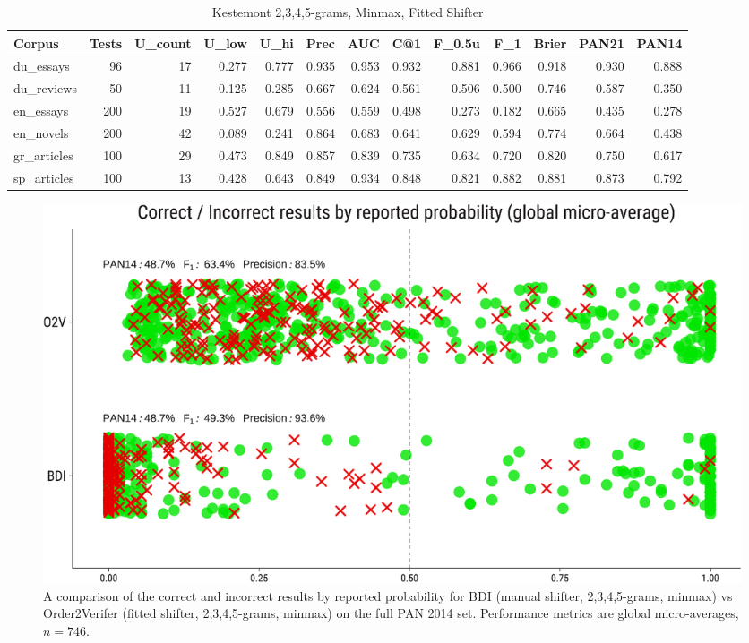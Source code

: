 \documentclass[
    hf
]{ceurart}
\begin{document}
\begin{table}
    \caption{Kestemont 2,3,4,5-grams, Minmax, Fitted Shifter}
    \label{tab:o2v}
    \raggedright
    \begin{adjustbox}{max width=\textwidth}

        \begin{tabular}{lrrrrrrrrrrrr}
            \toprule
            Corpus       & Tests & U_{count} & U_{low} & U_{hi} & Prec  & AUC   & C@1   & F_{0.5u} & F_1   & Brier & PAN21 & PAN14 \\
            \midrule
            du\_essays   & 96    & 17        & 0.277   & 0.777  & 0.935 & 0.953 & 0.932 & 0.881   & 0.966 & 0.918 & 0.930 & 0.888 \\
            du\_reviews  & 50    & 11        & 0.125   & 0.285  & 0.667 & 0.624 & 0.561 & 0.506   & 0.500 & 0.746 & 0.587 & 0.350 \\
            en\_essays   & 200   & 19        & 0.527   & 0.679  & 0.556 & 0.559 & 0.498 & 0.273   & 0.182 & 0.665 & 0.435 & 0.278 \\
            en\_novels   & 200   & 42        & 0.089   & 0.241  & 0.864 & 0.683 & 0.641 & 0.629   & 0.594 & 0.774 & 0.664 & 0.438 \\
            gr\_articles & 100   & 29        & 0.473   & 0.849  & 0.857 & 0.839 & 0.735 & 0.634   & 0.720 & 0.820 & 0.750 & 0.617 \\
            sp\_articles & 100   & 13        & 0.428   & 0.643  & 0.849 & 0.934 & 0.848 & 0.821   & 0.882 & 0.881 & 0.873 & 0.792 \\
            \bottomrule
        \end{tabular}
    \end{adjustbox}
\end{table}

\begin{figure}
    \includegraphics[width=\linewidth]{images/bdi_o2v-crop.pdf}
    \caption{A comparison of the correct and incorrect results by reported probability for BDI
        (manual shifter, 2,3,4,5-grams, minmax) vs Order2Verifer (fitted shifter, 2,3,4,5-grams,
        minmax) on the full PAN 2014 set. Performance metrics are global micro-averages, $n=746$.}
    \label{fig:bdi_o2v}
\end{figure}
\end{document}
